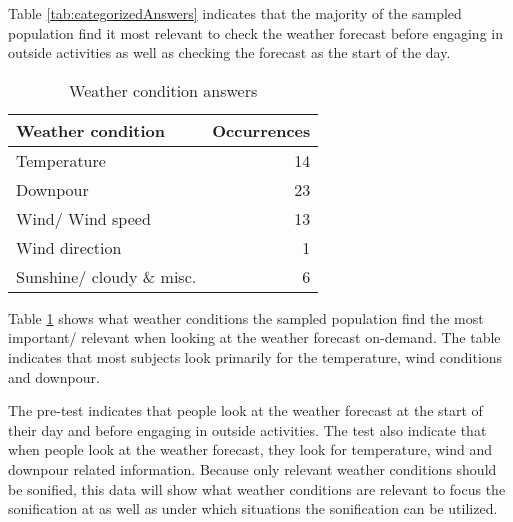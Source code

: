 Table \ref{tab:categorizedAnswers} indicates that the majority of the sampled population find it most relevant to check the weather forecast before engaging in outside activities as well as checking the forecast as the start of the day.

\begin{table}[!htbp]
    \centering
    \begin{tabular}{ l | r }
        \textbf{Weather condition} & \textbf{Occurrences} \\
        \hline
        Temperature & 14 \\
        Downpour & 23 \\
        Wind/ Wind speed & 13 \\
        Wind direction & 1 \\
        Sunshine/ cloudy \& misc. & 6 \\
    \end{tabular}
    \caption{Weather condition answers} \label{tab:weatherConditions}
\end{table}

Table \ref{tab:weatherConditions} shows what weather conditions the sampled population find the most important/ relevant when looking at the weather forecast on-demand.
The table indicates that most subjects look primarily for the temperature, wind conditions and downpour.
\bigskip

The pre-test indicates that people look at the weather forecast at the start of their day and before engaging in outside activities.
The test also indicate that when people look at the weather forecast, they look for temperature, wind and downpour related information.
Because only relevant weather conditions should be sonified, this data will show what weather conditions are relevant to focus the sonification at as well as under which situations the sonification can be utilized.
